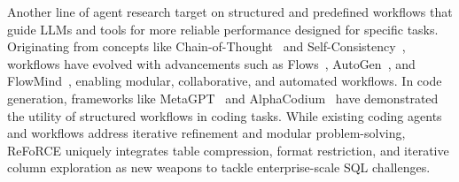 Another line of agent research target on structured and predefined workflows that guide LLMs and tools for more reliable performance designed for specific tasks. Originating from concepts like Chain-of-Thought~\citep{wei2022chain} and Self-Consistency~\citep{wang2022self}, workflows have evolved with advancements such as Flows~\citep{josifoski2023flows}, AutoGen~\citep{wu2023autogen}, and FlowMind~\citep{zeng2023flowmind}, enabling modular, collaborative, and automated workflows. In code generation, frameworks like MetaGPT~\citep{hong2023metagpt} and AlphaCodium~\citep{ridnik2024code} have demonstrated the utility of structured workflows in coding tasks. While existing coding agents and workflows address iterative refinement and modular problem-solving, ReFoRCE uniquely integrates table compression, format restriction, and iterative column exploration as new weapons to tackle enterprise-scale SQL challenges.